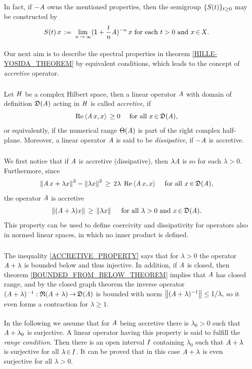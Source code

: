 \documentclass[11pt,twoside]{article}
\begin{document}
\subparagraph*{}
In fact,
if $-\mathit{A}$ owns the mentioned properties,
then the semigroup $\{{S}(t)\}_{t \geq 0}$ may be constructed by
\[
{S}(t) \, x \,:=\,
\lim_{\,n {\,\to\,} \infty} ({\mathsf{1}} + \frac{t}{n} \mathit{A})^{-n} \,x 
\mbox{ for each } t > 0 \mbox{ and } x {\,\in\,} \mathit{X}.
\]

\paragraph*{} %
Our next aim is to describe the spectral properties
in theorem \ref{HILLE-YOSIDA_THEOREM} by equivalent conditions,
which leads to the concept of \textit{accretive} operator.

\subparagraph*{}
Let $\mathit{H}$ be a complex Hilbert space,
then a linear operator $\mathit{A}$ with domain of definition $\mathfrak{D}(\mathit{A})$
acting in $\mathit{H}$ is called \textit{accretive}, if
\[
\operatorname{Re} \, \langle \mathit{A} \,x,x \rangle \, \geq 0
\quad \mbox{ for all } x {\,\in\,} \mathfrak{D}(\mathit{A}),
\]
or equivalently, 
if the numerical range $\Theta(\mathit{A})$ is part of the right complex half-plane.
Moreover,
a linear operator $\mathit{A}$ is said to be \textit{dissipative}, 
if $-\mathit{A}$ is accretive.

\subparagraph*{}
We first notice that if $\mathit{A}$ is accretive (dissipative),
then $\lambda \mathit{A}$ is so for each $\lambda > 0$.
Furthermore,
since 
\[
\left\lVert  \mathit{A} \,x + \lambda x \right\rVert^2 - \left\lVert \lambda x \right\rVert^2
\, \geq \,
2 \lambda \; \operatorname{Re} \, \langle \mathit{A} \,x,x \rangle
\quad \mbox{ for all } x {\,\in\,} \mathfrak{D}(\mathit{A}),
\]
the operator $\mathit{A}$ is accretive \iff
\begin{equation}\label{ACCRETIVE_PROPERTY}
\left\lVert (\mathit{A} + \lambda) x \right\rVert \, \geq \, \left\lVert \lambda x \right\rVert
\quad \mbox{ for all } \lambda > 0 \mbox{ and } x {\,\in\,} \mathfrak{D}(\mathit{A}).
\end{equation}
This property can be used to define coercivity and dissipativity
for operators also in normed linear spaces,
in which no inner product is defined.

\subparagraph*{}
The inequality \eqref{ACCRETIVE_PROPERTY} says that
for $\lambda > 0$
the operator $\mathit{A} + \lambda$ is bounded below and thus injective.
In addition,
if $\mathit{A}$ is closed,
then theorem \ref{BOUNDED_FROM_BELOW_THEOREM} implies that
$\mathit{A}$ has closed range,
and by the closed graph theorem the inverse operator
$(\mathit{A} + \lambda)^{-1}: \mathfrak{R}(\mathit{A} + \lambda) {\,\to\,} \mathfrak{D}(\mathit{A})$
is bounded with norm
$
\left\lVert (\mathit{A} + \lambda)^{-1} \right\rVert \leq  1 / {\lambda} ,
$
so it even forms a contraction for $\lambda \geq 1$.

\paragraph*{} %
In the following
we assume that for $\mathit{A}$ being accretive there is $\lambda_0 > 0$
such that $\mathit{A} + \lambda_0$ is surjective.
A linear operator having this property is said
to fulfill the \textit{range condition}.
Then there is an open interval $I$ containing $\lambda_0$
such that $\mathit{A} + \lambda$ is surjective for all $\lambda {\,\in\,} I$.
It can be proved that in this case
$\mathit{A} + \lambda$ is even surjective for all $\lambda > 0$.
\end{document}
